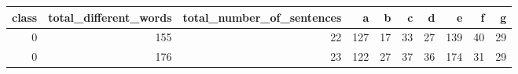 \begin{tabular}{rrrrrrrrrr}
\toprule
 class &  total\_different\_words &  total\_number\_of\_sentences &    a &   b &   c &   d &    e &   f &   g \\
\midrule
     0 &                    155 &                         22 &  127 &  17 &  33 &  27 &  139 &  40 &  29 \\
     0 &                    176 &                         23 &  122 &  27 &  37 &  36 &  174 &  31 &  29 \\
\bottomrule
\end{tabular}
